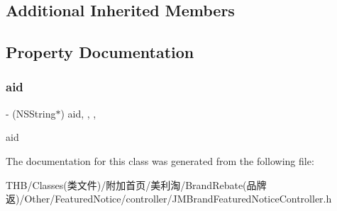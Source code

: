 \subsection*{Additional Inherited Members}


\subsection{Property Documentation}
\mbox{\label{interface_j_m_brand_featured_notice_controller_a6fbd5e9a64d44bbd6c6791e46dfdbbd9}} 
\subsubsection{\texorpdfstring{aid}{aid}}
{\footnotesize\ttfamily -\/ (N\+S\+String$\ast$) aid\hspace{0.3cm}{\ttfamily [read]}, {\ttfamily [write]}, {\ttfamily [nonatomic]}, {\ttfamily [copy]}}

aid 

The documentation for this class was generated from the following file\+:\begin{DoxyCompactItemize}
\item 
T\+H\+B/\+Classes(类文件)/附加首页/美利淘/\+Brand\+Rebate(品牌返)/\+Other/\+Featured\+Notice/controller/J\+M\+Brand\+Featured\+Notice\+Controller.\+h\end{DoxyCompactItemize}
